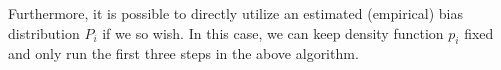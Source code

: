 \documentclass{article}
\begin{document}
Furthermore, it is possible to directly utilize an estimated (empirical) bias distribution $P_i$ if we so wish. 
In this case, we can keep density function $p_i$ fixed and only run the first three steps in the above algorithm. 



\end{document}
